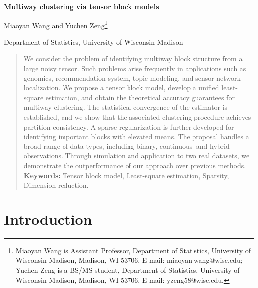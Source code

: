 \documentclass[11pt]{article}
\theoremstyle{plain}
\theoremstyle{definition}
\begin{document}
\begin{center}
\begin{spacing}{1.5}
\textbf{\Large Multiway clustering via tensor block models}
\end{spacing}


\vspace{5mm}
Miaoyan Wang and Yuchen Zeng\footnote{Miaoyan Wang is Assistant Professor, Department of Statistics, University of Wisconsin-Madison, Madison, WI 53706, E-mail: miaoyan.wang@wisc.edu; Yuchen Zeng is a BS/MS student, Department of Statistics, University of Wisconsin-Madison, Madison, WI 53706, E-mail: yzeng58@wisc.edu.}

\vspace{5mm}
Department of Statistics, University of Wisconsin-Madison
\end{center}

\begin{abstract}
We consider the problem of identifying multiway block structure from a large noisy tensor. Such problems arise frequently in applications such as genomics, recommendation system, topic modeling, and sensor network localization. We propose a tensor block model, develop a unified least-square estimation, and obtain the theoretical accuracy guarantees for multiway clustering. The statistical convergence of the estimator is established, and we show that the associated clustering procedure achieves partition consistency. A sparse regularization is further developed for identifying important blocks with elevated means. The proposal handles a broad range of data types, including binary, continuous, and hybrid observations. Through simulation and application to two real datasets, we demonstrate the outperformance of our approach over previous methods.\\

{\bf Keywords:} Tensor block model, Least-square estimation, Sparsity, Dimension reduction.

\end{abstract}

\section{Introduction}
\end{document}
